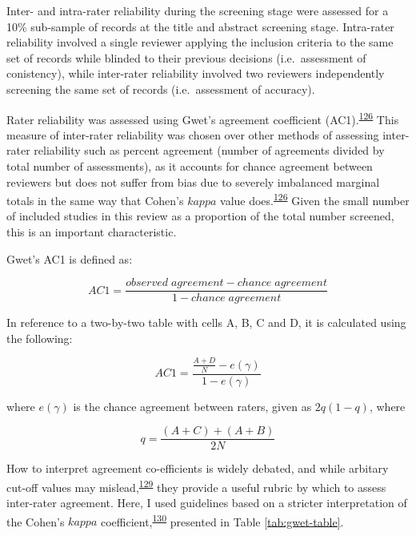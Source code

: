 \documentclass[a4paper, twoside]{templates/ociamthesis}
\begin{document}
Inter- and intra-rater reliability during the screening stage were assessed for a 10\% sub-sample of records at the title and abstract screening stage. Intra-rater reliability involved a single reviewer applying the inclusion criteria to the same set of records while blinded to their previous decisions (i.e.~assessment of conistency), while inter-rater reliability involved two reviewers independently screening the same set of records (i.e.~assessment of accuracy).

Rater reliability was assessed using Gwet's agreement coefficient (AC1).\textsuperscript{\protect\hyperlink{ref-gwet2008}{126}} This measure of inter-rater reliability was chosen over other methods of assessing inter-rater reliability such as percent agreement (number of agreements divided by total number of assessments), as it accounts for chance agreement between reviewers but does not suffer from bias due to severely imbalanced marginal totals in the same way that Cohen's \(kappa\) value does.\textsuperscript{\protect\hyperlink{ref-gwet2008}{126}} Given the small number of included studies in this review as a proportion of the total number screened, this is an important characteristic.

Gwet's AC1 is defined as:

\[AC1 = \frac{observed\;agreement-chance\;agreement}{1-chance\;agreement}\]

In reference to a two-by-two table with cells A, B, C and D, it is calculated using the following:

\begin{equation}
  AC1 = \frac{\frac{A+D}{N}-e(\gamma)}{1-e(\gamma)}
  \label{eq:AC1-main}
\end{equation}

where \(e(\gamma)\) is the chance agreement between raters, given as \(2q(1-q)\), where

\begin{equation}
  q = \frac{(A+C)+(A+B)}{2N}
  \label{eq:AC1-supp}
\end{equation}

How to interpret agreement co-efficients is widely debated, and while arbitary cut-off values may mislead,\textsuperscript{\protect\hyperlink{ref-brennan1992}{129}} they provide a useful rubric by which to assess inter-rater agreement. Here, I used guidelines based on a stricter interpretation of the Cohen's \(kappa\) coefficient,\textsuperscript{\protect\hyperlink{ref-mchugh2012}{130}} presented in Table \ref{tab:gwet-table}.
\end{document}
